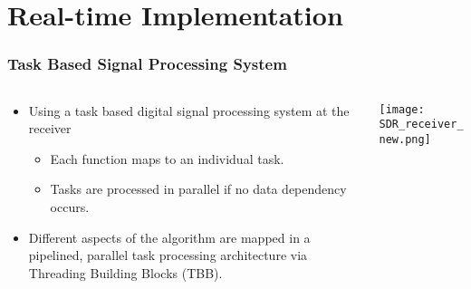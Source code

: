 \section{Real-time Implementation}



\begin{frame}
    \frametitle{Task Based Signal Processing System}

    \begin{columns}
      \begin{column}{0.515\textwidth}
        
        \begin{itemize}
          \item Using a task based digital signal processing system at the receiver 
          \begin{itemize}
              \item Each function maps to an individual task. 
              \item Tasks are processed in parallel if no data dependency occurs.             
             
          \end{itemize} 
          \item Different aspects of the algorithm are mapped in 
          a pipelined, parallel task processing architecture via Threading Building Blocks (TBB). 


        \end{itemize}

      \end{column} 

    \begin{column}{0.46\textwidth} 

        \begin{center}
          \texttt{[image: SDR\_receiver\_new.png]}
        \end{center}
      
      \end{column}
    \end{columns}



\end{frame}
